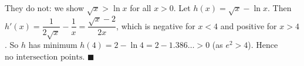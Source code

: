 They do not: we show $\sqrt x>\ln x$ for all $x>0$. Let $h(x)=\sqrt x-\ln x$. Then $h'(x)=\dfrac1{2\sqrt x}-\dfrac1x=\dfrac{\sqrt x-2}{2x}$, which is negative for $x<4$ and positive for $x>4$. So $h$ has minimum $h(4)=2-\ln4=2-1.386\ldots>0$ (as $e^2>4$). Hence $\boxed{\text{no intersection points}}$. $\blacksquare$
